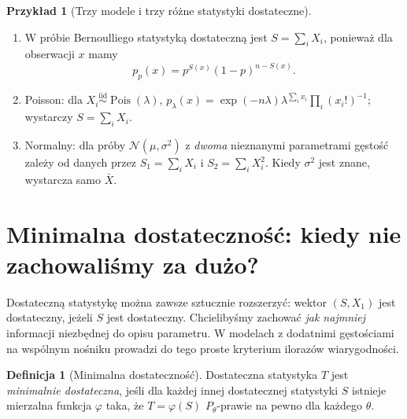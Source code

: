 \documentclass[11pt,a4paper,oneside]{report}
\numberwithin{equation}{chapter}
\theoremstyle{plain}
\theoremstyle{definition}
\newtheorem{definicja}{Definicja}[chapter]
\newtheorem{przyklad}{Przykład}[chapter]
\theoremstyle{remark}
\newcommand{\Normal}{\mathcal N}
\newcommand{\iid}{\mathrel{\overset{\mathrm{iid}}\sim}}
\DeclareMathOperator{\Pois}{Pois}
\begin{document}
\begin{przyklad}[Trzy modele i trzy różne statystyki dostateczne]
\begin{enumerate}
\item W próbie Bernoulliego statystyką dostateczną jest
$S=\sum_iX_i$, ponieważ dla obserwacji $x$ mamy
\[
p_p(x)=p^{S(x)}(1-p)^{n-S(x)}.
\]
\item Poisson: dla $X_i\iid\Pois(\lambda)$,
$p_\lambda(x)=\exp(-n\lambda)\lambda^{\sum_i x_i}
\prod_i(x_i!)^{-1}$; wystarczy $S=\sum_iX_i$.
\item Normalny: dla próby $\Normal(\mu,\sigma^2)$ z \emph{dwoma}
nieznanymi parametrami gęstość zależy od danych przez
$S_1=\sum_iX_i$ i $S_2=\sum_iX_i^2$.
Kiedy $\sigma^2$ jest znane, wystarcza samo $\bar X$.
\end{enumerate}
\end{przyklad}

\section{Minimalna dostateczność: kiedy nie zachowaliśmy za dużo?}
Dostateczną statystykę można zawsze sztucznie rozszerzyć:
wektor $(S,X_1)$ jest dostateczny, jeżeli $S$ jest dostateczny.
Chcielibyśmy zachować \emph{jak najmniej} informacji niezbędnej
do opisu parametru. W modelach z dodatnimi gęstościami na wspólnym
nośniku prowadzi do tego proste kryterium ilorazów wiarygodności.

\begin{definicja}[Minimalna dostateczność]
Dostateczna statystyka $T$ jest \emph{minimalnie dostateczna},
jeśli dla każdej innej dostatecznej statystyki $S$ istnieje mierzalna
funkcja $\varphi$ taka, że $T=\varphi(S)$ $P_\theta$-prawie na pewno
dla każdego $\theta$.
\end{definicja}
\end{document}

